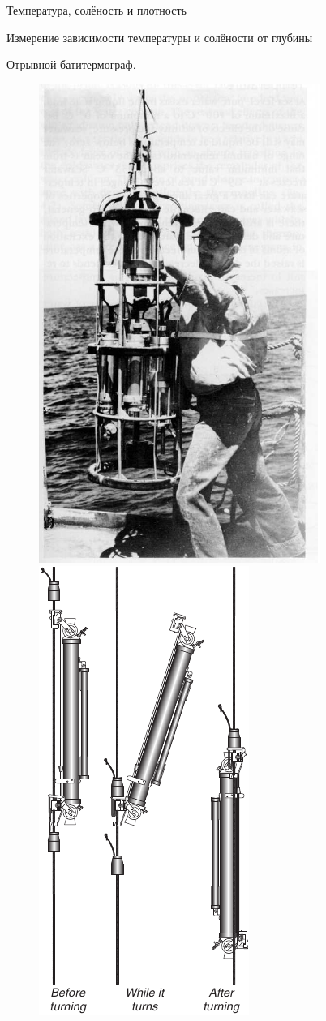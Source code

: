 \begin{chapter}{Температура, солёность и плотность}
\begin{section}{Измерение зависимости температуры и солёности от глубины}
\begin{paragraph}{Отрывной батитермограф.}
\begin{figure}[t!]
\includegraphics{pics/ctdnansen}
\ \ \ \ \ \
\includegraphics{pics/ctdnansenRight}

\end{figure}
\end{paragraph}
\end{section}
\end{chapter}
